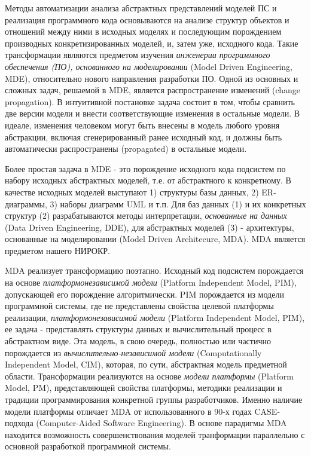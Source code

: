 \documentclass[12pt]{article}
\begin{document}
Методы автоматизации анализа абстрактных представлений моделей ПС и реализация программного кода основываются на анализе структур объектов и отношений между ними в исходных моделях и последующим порождением производных конкретизированных моделей, и, затем уже, исходного кода.  Такие трансформации являются предметом изучения \emph{инженерии программного обеспечения (ПО), основанного на моделировании} (Model Driven Engineering, MDE), относительно нового направления разработки ПО.  Одной из основных и сложных задач, решаемой в MDE, является распространение изменений (change propagation).  В интуитивной постановке задача состоит в том, чтобы сравнить две версии модели и внести соответствующие изменения в остальные модели.  В идеале, изменения человеком могут быть внесены в модель любого уровня абстракции, включая сгенерированный ранее исходный код, и должны быть автоматически распространены (propagated) в остальные модели.

Более простая задача в MDE - это порождение исходного кода подсистем по набору исходных абстрактных моделей, т.е. от абстрактного к конкретному.  В качестве исходных моделей выступают 1) структуры базы данных, 2) ER-диаграммы, 3) наборы диаграмм UML и т.п.  Для баз данных (1) и их конкретных структур (2) разрабатываются методы интерпретации, \emph{основанные на данных} (Data Driven Engineering, DDE), для абстрактных моделей (3) - архитектуры, основанные на моделировании (Model Driven Architecure, MDA).  MDA является предметом нашего НИРОКР.

MDA реализует трансформацию поэтапно.  Исходный код подсистем порождается на основе \emph{платформонезависимой модели} (Platform Independent Model, PIM), допускающей его порождение алгоритмически.  PIM порождается из модели программной системы, где не представлены свойства целевой платформы реализации, \emph{платформонезависимой модели} (Platform Independent Model, PIM), ее задача - представлять структуры данных и вычислительный процесс в абстрактном виде.  Эта модель, в свою очередь, полностью или частично порождается из \emph{вычислительно-независимой модели} (Computationally Independent Model, CIM), которая, по сути, абстрактная модель предметной области.  Трансформации реализуются на основе \emph{модели платформы} (Platform Model, PM), представляющей свойства платформы, методики реализации и традиции программирования конкретной группы разработчиков.  Именно наличие модели платформы отличает MDA от использованного в 90-х годах CASE-подхода (Computer-Aided Software Engineering).  В основе парадигмы MDA находится возможность совершенствования моделей транформации параллельно с основной разработкой программной системы.
\end{document}
